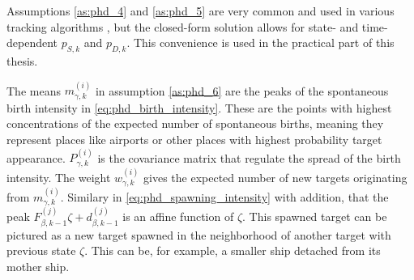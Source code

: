 Assumptions \ref{as:phd_4} and \ref{as:phd_5} are very common and used in various tracking algorithms \cite{bar1988tracking}, but the closed-form solution allows for state- and time-dependent $p_{S,k}$ and $p_{D,k}$. This convenience is used in the practical part of this thesis.

The means $m_{\gamma,k}^{(i)}$ in assumption \ref{as:phd_6} are the peaks of the spontaneous birth intensity in \eqref{eq:phd_birth_intensity}. These are the points with highest concentrations of the expected number of spontaneous births, meaning they represent places like airports or other places with highest probability target appearance. $P_{\gamma,k}^{(i)}$ is the covariance matrix that regulate the spread of the birth intensity. The weight $w_{\gamma, k}^{(i)}$ gives the expected number of new targets originating from $m_{\gamma,k}^{(i)}$. Similary in \eqref{eq:phd_spawning_intensity} with addition, that the peak $F_{\beta,k-1}^{(j)}\zeta + d_{\beta,k-1}^{(j)}$ is an affine function of $\zeta$. This spawned target can be pictured as a new target spawned in the neighborhood of another target with previous state $\zeta$. This can be, for example, a smaller ship detached from its mother ship.

